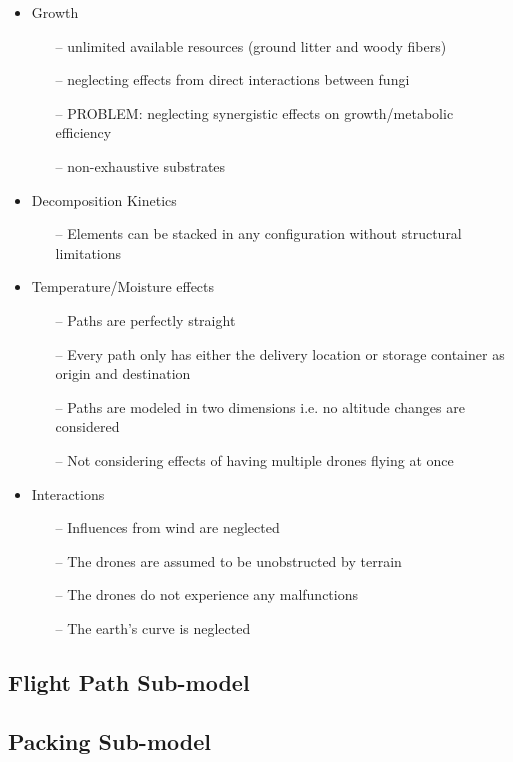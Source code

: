 \documentclass[12pt]{article}
\begin{document}
\begin{multicols}{2}
\begin{itemize}
	\item Growth
	\begin{itemize}
		\item[--] unlimited available resources (ground litter and woody fibers)
		\item[--] neglecting effects from direct interactions between fungi
		\item[--] PROBLEM: neglecting synergistic effects on growth/metabolic efficiency
		\item[--] non-exhaustive substrates
	\end{itemize}
	\item Decomposition Kinetics
	\begin{itemize}
		\item[--] Elements can be stacked in any configuration without structural limitations
	\end{itemize}
	\item Temperature/Moisture effects
	\begin{itemize}
		\item[--] Paths are perfectly straight
		\item[--] Every path only has either the delivery location or storage container as origin and destination
		\item[--] Paths are modeled in two dimensions i.e. no altitude changes are considered
		\item[--] Not considering effects of having multiple drones flying at once
	\end{itemize}
	\item Interactions
	\begin{itemize}
		\item[--] Influences from wind are neglected
		\item[--] The drones are assumed to be unobstructed by terrain
		\item[--] The drones do not experience any malfunctions
		\item[--] The earth’s curve is neglected
	\end{itemize}
\end{itemize}


\subsection{Flight Path Sub-model}
\lipsum[3]

\subsection{Packing Sub-model}
\lipsum[4]


\end{multicols}
\end{document}
